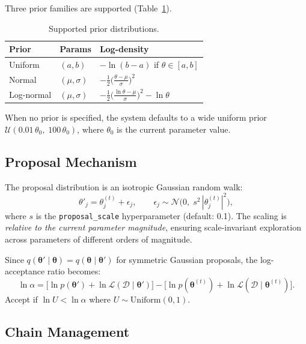 \documentclass[11pt,letterpaper,twocolumn]{article}
\newcommand{\code}[1]{\texttt{#1}}
\theoremstyle{definition}
\begin{document}
Three prior families are supported (Table~\ref{tab:priors}).

\begin{table}[H]
\centering
\caption{Supported prior distributions.}\label{tab:priors}
\small
\setlength{\tabcolsep}{4pt}
\begin{tabular}{@{}llp{3.2cm}@{}}
\toprule
\textbf{Prior} & \textbf{Params} & \textbf{Log-density} \\
\midrule
Uniform   & $(a,b)$         & $-\ln(b{-}a)$ if $\theta\!\in\![a,b]$ \\
Normal    & $(\mu,\sigma)$  & $-\frac{1}{2}\bigl(\frac{\theta-\mu}{\sigma}\bigr)^{2}$ \\
Log-normal& $(\mu,\sigma)$  & $-\frac{1}{2}\bigl(\frac{\ln\theta-\mu}{\sigma}\bigr)^{2} - \ln\theta$ \\
\bottomrule
\end{tabular}
\end{table}

\noindent
When no prior is specified, the system defaults to a wide uniform prior $\mathcal{U}(0.01\,\theta_0,\;100\,\theta_0)$, where $\theta_0$ is the current parameter value.

\subsection{Proposal Mechanism}

The proposal distribution is an isotropic Gaussian random walk:
\begin{equation}\label{eq:proposal}
  \theta'_j = \theta^{(t)}_j + \epsilon_j,
  \qquad
  \epsilon_j \sim \mathcal{N}\!\big(0,\;s^2\,|\theta^{(t)}_j|^2\big),
\end{equation}
where $s$ is the \code{proposal\_scale} hyperparameter (default: 0.1).  The scaling is \emph{relative to the current parameter magnitude}, ensuring scale-invariant exploration across parameters of different orders of magnitude.

Since $q(\bm{\theta}' \mid \bm{\theta}) = q(\bm{\theta} \mid \bm{\theta}')$ for symmetric Gaussian proposals, the log-acceptance ratio becomes:
\begin{equation}
  \ln\alpha = \big[\ln p(\bm{\theta}') + \ln\mathcal{L}(\mathcal{D}\mid\bm{\theta}')\big]
            - \big[\ln p(\bm{\theta}^{(t)}) + \ln\mathcal{L}(\mathcal{D}\mid\bm{\theta}^{(t)})\big].
\end{equation}
Accept if $\ln U < \ln\alpha$ where $U \sim \mathrm{Uniform}(0,1)$.

\subsection{Chain Management}
\end{document}
